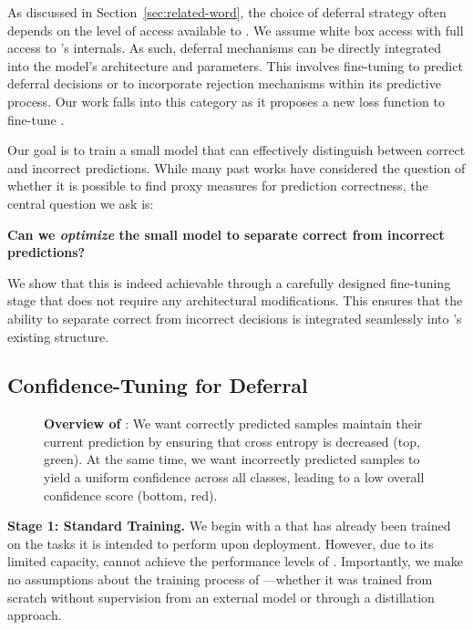 As discussed in Section~\ref{sec:related-word}, the choice of deferral strategy often depends on the level of access available to \smallmodel. We assume white box access with full access to \smallmodel's internals. As such, deferral mechanisms can be directly integrated into the model's architecture and parameters. This involves fine-tuning \smallmodel to predict deferral decisions or to incorporate rejection mechanisms within its predictive process. Our work falls into this category as it proposes a new loss function to fine-tune \smallmodel. 

Our goal is to train a small model that can effectively distinguish between correct and incorrect predictions. While many past works have considered the question of whether it is possible to find proxy measures for prediction correctness, the central question we ask is:
\begin{center}
\textbf{Can we \emph{optimize} the small model \smallmodel to separate correct from incorrect predictions?}
\end{center}
\noindent We show that this is indeed achievable through a carefully designed fine-tuning stage that does not require any architectural modifications. This ensures that the ability to separate correct from incorrect decisions is integrated seamlessly into \smallmodel's existing structure.


\subsection{Confidence-Tuning for Deferral}

\begin{figure}
    \centering
    \resizebox{\linewidth}{!}{
    
    }
    \vspace{-15pt}
    \caption{\textbf{Overview of \loss}: We want correctly predicted samples maintain their current prediction by ensuring that cross entropy is decreased (top, green). At the same time, we want incorrectly predicted samples to yield a uniform confidence across all classes, leading to a low overall confidence score (bottom, red).}
    \label{fig:opt_goal}
\end{figure}

\textbf{Stage 1: Standard Training.} We begin with a \smallmodel that has already been trained on the tasks it is intended to perform upon deployment. However, due to its limited capacity, \smallmodel cannot achieve the performance levels of \bigmodel. Importantly, we make no assumptions about the training process of \smallmodel—whether it was trained from scratch without supervision from an external model or through a distillation approach.

